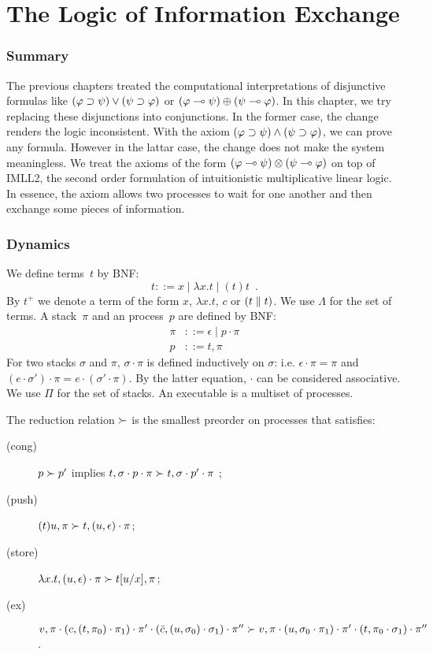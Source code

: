 \chapter{The Logic of Information Exchange}
\label{ch:exchange}

\subsection{Summary}

The previous chapters treated the computational interpretations of
disjunctive formulas like $(\varphi\supset\psi)\lor(\psi\supset\varphi)$ or
$(\varphi\multimap\psi)\oplus(\psi\multimap\varphi)$.  In this chapter, we try
replacing these disjunctions into conjunctions.
In the former case, the change renders the logic inconsistent.
With the axiom $(\varphi\supset\psi)\land(\psi\supset\varphi)$,
we can prove any formula.  However in the lattar case, the change does
not make the system meaningless.  We treat
the axioms of the form $(\varphi\multimap\psi)\otimes(\psi\multimap\varphi)$
on top of IMLL2, the second order formulation of intuitionistic
multiplicative linear
logic.  In essence, the axiom allows two processes to wait for one
another and then exchange some pieces of information.

\subsection{Dynamics}

We define terms~$t$ by BNF:
\[
 t ::= x\mid \lambda x.t\mid (t)t\enspace.
\]
By $t^+$ we denote a term of the form $x$, $\lambda x.t$, $c$ or $(t\parallel
t)$.
We use $\Lambda$ for the set of terms.
A stack~$\pi$ and an process~$p$
are defined by BNF:
\begin{align*}
 \pi &::= \epsilon\mid p\cdot\pi\\
 p   &::= t,\pi
\end{align*}
For two stacks $\sigma$ and $\pi$, $\sigma\cdot\pi$ is defined
inductively on $\sigma$: i.e. $\epsilon\cdot\pi = \pi$ and $(e
\cdot \sigma') \cdot \pi = e\cdot (\sigma'\cdot \pi)$.  By the latter
equation, $\cdot$ can be considered associative.
We use $\Pi$ for the set of stacks.
An executable is a multiset of processes.

The reduction relation $\succ$ is the smallest preorder on processes
that satisfies:
\begin{description}
 \item[(cong)] $p\succ p'$ implies $t, \sigma \cdot p \cdot \pi\succ
      t,\sigma\cdot p'\cdot \pi$ \enspace;
 \item[(push)]
	    $(t)u, \pi   \succ t,(u,\epsilon)\cdot\pi$\enspace;
 \item[(store)]
	    $\lambda x.t,(u,\epsilon)\cdot\pi
	     \succ
	     t[u/x], \pi$\enspace;
 \item[(ex)]
           $v, \pi\cdot (c, (t,\pi_0)\cdot \pi_1)\cdot\pi' \cdot (\bar{c},(u,\sigma_0)\cdot \sigma_1) \cdot \pi''\succ
      v, \pi\cdot (u, \sigma_0\cdot \pi_1)\cdot\pi' \cdot (
      t,\pi_0\cdot \sigma_1) \cdot \pi''
      $
      \enspace.
\end{description}


